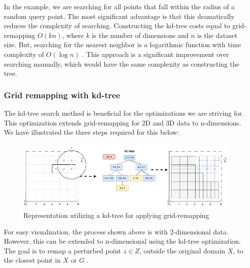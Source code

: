 In the example, we are searching for all points that fall within the radius of a random query point.
The most significant advantage is that this dramatically reduces the complexity of searching.
Constructing the kd-tree costs equal to grid-remapping $O(kn)$, where $k$ is the number of dimensions and $n$ is the dataset size.
But, searching for the nearest neighbor is a logarithmic function with time complexity of $O(\log n)$ \citep{washington_k-d_2002}.
This approach is a significant improvement over searching manually, which would have the same complexity as constructing the tree.

\subsubsection{Grid remapping with kd-tree} \label{theory:grid-remapping}
The kd-tree search method is beneficial for the optimizations we are striving for.
This optimization extends grid-remapping for 2D \citep{DBLP:journals/corr/abs-1212-1984} and 3D data \citep{9646489} to n-dimensions. \newline
We have illustrated the three steps required for this below:
\begin{figure}[H]
  \includegraphics[width=1\textwidth]{TheorethicalFramework/ND-Laplace/Images/KD-tree.png}
  \caption{Representation utilizing a kd-tree for applying grid-remapping \citep{DBLP:journals/corr/abs-1212-1984}}
  \label{fig:kd-tree}
\end{figure}
For easy visualization, the process shown above is with 2-dimensional data.
However, this can be extended to n-dimensional using the kd-tree optimization.
The goal is to remap a perturbed point $z \in Z$, outside the original domain $X$, to the closest point in $X$ or $G$ \citep{DBLP:journals/corr/abs-1212-1984}.

